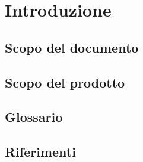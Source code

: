 \section{Introduzione}
\subsection{Scopo del documento}
\subsection{Scopo del prodotto}
\subsection{Glossario}
\subsection{Riferimenti}